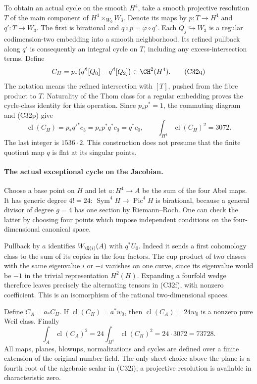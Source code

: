 To obtain an actual cycle on the smooth
$H^4$, take a smooth projective resolution
$T$ of the main component of
$H^4\times_{W_0}W_3$.  Denote its maps by
$p:T\to H^4$ and $q':T\to W_3$.
The first is birational and
$q\circ p=\varphi\circ q'$.
Each $Q_j\hookrightarrow W_3$ is a regular
codimension-two embedding into a smooth
neighborhood.  Its refined pullback along
$q'$ is consequently an integral cycle on
$T$, including any excess-intersection
terms.  Define
\[
 C_H=p_*\bigl(q'^![Q_0]-q'^![Q_2]\bigr)\in\CH^2(H^4).
                                                        \tag{C32q}
\]
The notation means the refined intersection
with $[T]$, pushed from the fibre product
to $T$.  Naturality of the Thom class for
a regular embedding proves the cycle-class
identity for this operation.  Since
$p_*p^*=1$, the commuting diagram and
(C32p) give
\[
 \operatorname{cl}(C_H)=p_*q'^*c_3
                      =p_*p^*q^*c_0=q^*c_0,
 \qquad
              \int_{H^4}\operatorname{cl}(C_H)^2=3072.
                                                        \tag{C32r}
\]
The last integer is $1536\cdot2$.
This construction does not presume that the
finite quotient map $q$ is flat at its
singular points.

\paragraph{The actual exceptional cycle on the Jacobian.}
Choose a base point on $H$ and let
$a:H^4\to A$ be the sum of the four Abel
maps.  It has generic degree $4!=24$:
$\operatorname{Sym}^4H\to\operatorname{Pic}^4H$
is birational, because a general divisor of
degree $g=4$ has one section by Riemann--Roch.
One can check the latter by choosing four
points which impose independent conditions
on the four-dimensional canonical space.

Pullback by $a$ identifies $W_{\Q(i)}(A)$
with $q^*U_0$.  Indeed it sends a first
cohomology class to the sum of its copies
in the four factors.  The cup product of
two classes with the same eigenvalue $i$
or $-i$ vanishes on one curve, since its
eigenvalue would be $-1$ in the trivial
representation $H^2(H)$.  Expanding a
fourfold wedge therefore leaves precisely
the alternating tensors in (C32f), with
nonzero coefficient.  This is an isomorphism
of the rational two-dimensional spaces.

Define $C_A=a_*C_H$.  If
$\operatorname{cl}(C_H)=a^*w_0$, then
$\operatorname{cl}(C_A)=24w_0$ is a nonzero
pure Weil class.  Finally
\[
 \int_A\operatorname{cl}(C_A)^2
   =24\int_{H^4}\operatorname{cl}(C_H)^2
   =24\cdot3072=73728.
                                                        \tag{C32s}
\]
All maps, planes, blowups, normalizations
and cycles are defined over a finite
extension of the original number field.
The only sheet choice above the plane
is a fourth root of the algebraic scalar
in (C32i); a projective resolution is
available in characteristic zero.

